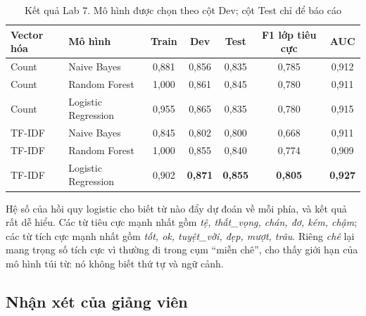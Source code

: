 \begin{table}[H]
\centering
\begin{tabular}{|l|l|c|c|c|c|c|}
\hline
\textbf{Vector hóa} & \textbf{Mô hình} & \textbf{Train} & \textbf{Dev} & \textbf{Test} & \textbf{F1 lớp tiêu cực} & \textbf{AUC} \\
\hline
Count & Naive Bayes & 0,881 & 0,856 & 0,835 & 0,785 & 0,912 \\ \hline
Count & Random Forest & 1,000 & 0,861 & 0,845 & 0,780 & 0,911 \\ \hline
Count & Logistic Regression & 0,955 & 0,865 & 0,835 & 0,780 & 0,915 \\ \hline
TF-IDF & Naive Bayes & 0,845 & 0,802 & 0,800 & 0,668 & 0,911 \\ \hline
TF-IDF & Random Forest & 1,000 & 0,855 & 0,840 & 0,774 & 0,909 \\ \hline
TF-IDF & Logistic Regression & 0,902 & \textbf{0,871} & \textbf{0,855} & \textbf{0,805} & \textbf{0,927} \\ \hline
\end{tabular}
\caption{Kết quả Lab 7. Mô hình được chọn theo cột Dev; cột Test chỉ để báo cáo}
\label{tab:lab-sentiment}
\end{table}


Hệ số của hồi quy logistic cho biết từ nào đẩy dự đoán về mỗi phía, và kết quả rất dễ hiểu. Các từ tiêu cực mạnh nhất gồm \textit{tệ, thất\_vọng, chán, đơ, kém, chậm}; các từ tích cực mạnh nhất gồm \textit{tốt, ok, tuyệt\_vời, đẹp, mượt, trâu}. Riêng \textit{chê} lại mang trọng số tích cực vì thường đi trong cụm ``miễn chê'', cho thấy giới hạn của mô hình túi từ: nó không biết thứ tự và ngữ cảnh.

\subsection{Nhận xét của giảng viên}

